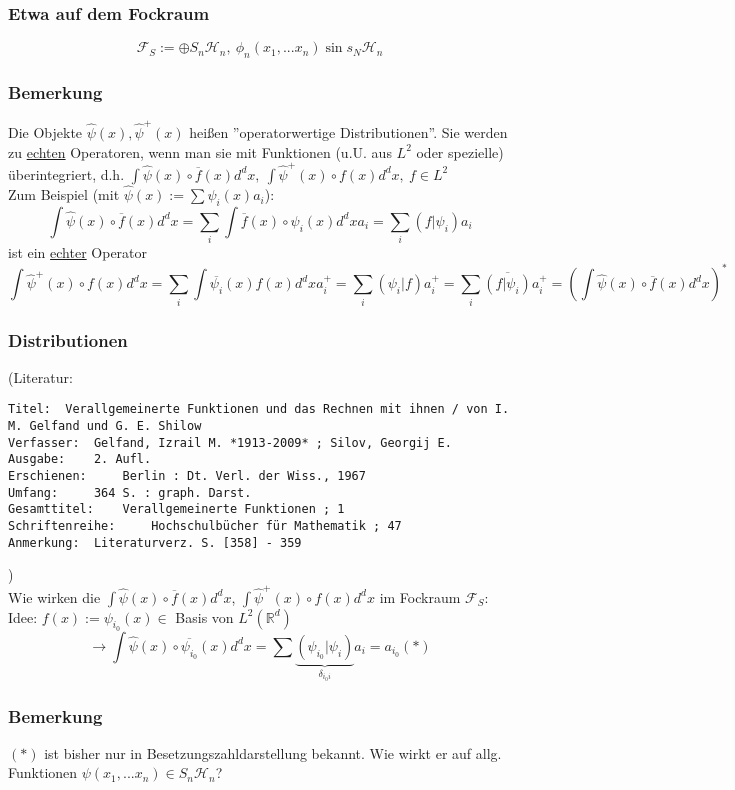 \documentclass[twoside,a4paper]{scrartcl}
\newcommand{\R}{\mathbb{R}}
\renewcommand{\1}{\mathds{1}}
\newcommand{\ra}{\rightarrow}
\renewcommand{\H}{\mathcal{H}}
\newcommand{\F}{\mathcal{F}}
\renewcommand{\R}{\mathbb{R}}
\begin{document}
\subsubsection*{Etwa auf dem Fockraum}
$$\F_S:= \oplus S_n\H_n, \ \phi_n(x_1,...x_n) \sin s_N \H_n$$
\subsubsection*{Bemerkung}
Die Objekte $\hat \psi(x), \hat \psi^+(x)$ heißen ''operatorwertige Distributionen''. Sie werden zu \underline{echten} Operatoren, wenn man sie mit Funktionen (u.U. aus $L^2$ oder spezielle) überintegriert, d.h. 
$\int \hat \psi(x) \circ \overline{f}(x) d^dx, \ \int \hat \psi^+(x) \circ {f}(x) d^dx, \ f \in L^2$\\
Zum Beispiel (mit $\hat \psi(x):= \sum \psi_i(x)a_i$):
$$\int \hat \psi(x) \circ \overline{f}(x) d^dx=\sum_i \int \overline{f}(x) \circ \psi_i(x) d^dx a_i=\sum_i (f|\psi_i)a_i$$
ist ein \underline{echter} Operator
$$\int \hat \psi^+(x) \circ {f}(x) d^dx=\sum_i \int \overline{\psi_i}(x) {f}(x)  d^dx a^+_i=\sum_i (\psi_i|f)a^+_i=\sum_i \overline{(f|\psi_i)}a^+_i=(\int \hat \psi(x) \circ \overline{f}(x) d^dx)^*$$

\subsubsection*{Distributionen}
(Literatur: \begin{tiny}
\begin{verbatim}
Titel: 	Verallgemeinerte Funktionen und das Rechnen mit ihnen / von I. M. Gelfand und G. E. Shilow
Verfasser: 	Gelfand, Izrail M. *1913-2009* ; Silov, Georgij E.
Ausgabe: 	2. Aufl.
Erschienen: 	Berlin : Dt. Verl. der Wiss., 1967
Umfang: 	364 S. : graph. Darst.
Gesamttitel: 	Verallgemeinerte Funktionen ; 1
Schriftenreihe: 	Hochschulbücher für Mathematik ; 47
Anmerkung: 	Literaturverz. S. [358] - 359
\end{verbatim}
\end{tiny}
)\\
Wie wirken die $\int \hat \psi(x) \circ \overline{f}(x) d^dx$, $\int \hat \psi^+(x) \circ {f}(x) d^dx$ im Fockraum $\F_S$:\\
Idee: $f(x):= \psi_{i_0}(x) \in$ Basis von $L^2(\R^d)$\\
$$\ra \int \hat \psi(x) \circ \overline{\psi_{i_0}}(x) d^dx=\sum \underbrace{(\psi_{i_0}|\psi_i)}_{\delta_{i_0i}}a_i=a_{i_0} (*) $$
\subsubsection*{Bemerkung}
$(*)$ ist bisher nur in Besetzungszahldarstellung bekannt. Wie wirkt er auf allg. Funktionen $\psi(x_1,...x_n) \in S_n\H_n$?
\end{document}
